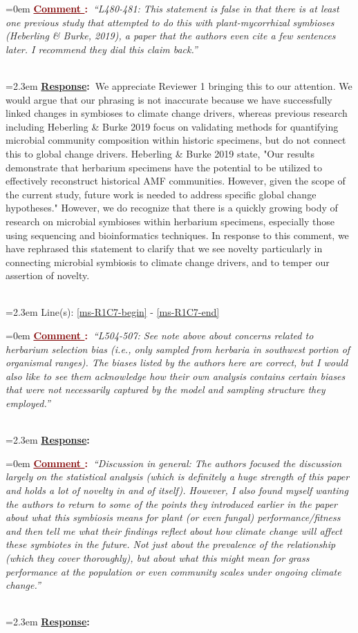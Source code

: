 \documentclass[12pt]{article}
\newcounter{cN}
\newcommand{\comment}[1]{
	\vspace{2em}
	\refstepcounter{cN} %
	\noindent \hangindent=0em \textbf{\textcolor{Maroon}{\uline{Comment \thecN}:~}}\emph{``#1''}
	}
\newcommand{\response}[1]{
	\\[0.25em]
	\hangindent=2.3em \textbf{\textcolor{NavyBlue}{\uline{Response}:~}}#1
	}
\newcommand{\linesref}[2]{
		\\[0.25em]
	\hangindent=2.3em {\color{Mahogany} Line(s): \ref{#1} - \ref{#2}}
}
\begin{document}
\comment{L480-481: This statement is false in that there is at least one previous study that attempted to do this with plant-mycorrhizal symbioses (Heberling \& Burke, 2019), a paper that the authors even cite a few sentences later. I recommend they dial this claim back.}
\response{We appreciate Reviewer 1 bringing this to our attention. We would argue that our phrasing is not inaccurate because we have successfully linked changes in symbioses to climate change drivers, whereas previous research including Heberling \& Burke 2019 focus on validating methods for quantifying microbial community composition within historic specimens, but do not connect this to global change drivers. Heberling \& Burke 2019 state, "Our results demonstrate that herbarium specimens have the potential to be utilized to effectively reconstruct historical AMF communities. However, given the scope of the current study, future work is needed to address specific global change hypotheses." However, we do recognize that there is a quickly growing body of research on microbial symbioses within herbarium specimens, especially those using sequencing and bioinformatics techniques. In response to this comment, we have rephrased this statement to clarify that we see novelty particularly in connecting microbial symbiosis to climate change drivers, and to temper our assertion of novelty.}
\linesref{ms-R1C7-begin}{ms-R1C7-end}


\comment{L504-507: See note above about concerns related to herbarium selection bias (i.e., only sampled from herbaria in southwest portion of organismal ranges). The biases listed by the authors here are correct, but I would also like to see them acknowledge how their own analysis contains certain biases that were not necessarily captured by the model and sampling structure they employed.}
\response{}



\comment{Discussion in general: The authors focused the discussion largely on the statistical analysis (which is definitely a huge strength of this paper and holds a lot of novelty in and of itself). However, I also found myself wanting the authors to return to some of the points they introduced earlier in the paper about what this symbiosis means for plant (or even fungal) performance/fitness and then tell me what their findings reflect about how climate change will affect these symbiotes in the future. Not just about the prevalence of the relationship (which they cover thoroughly), but about what this might mean for grass performance at the population or even community scales under ongoing climate change.}
\response{}
\end{document}
